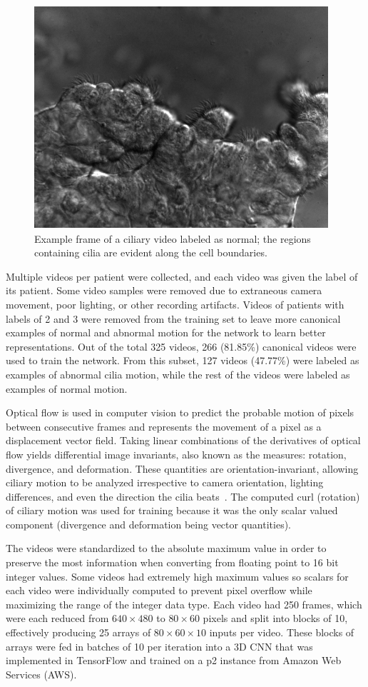\begin{figure}[htp]
\includegraphics[scale=0.78]{grey_1011-5_heathly}
\caption{Example frame of a ciliary video labeled as normal; the regions containing cilia are evident along the cell boundaries.}
\label{fig:cilia}
\end{figure}

Multiple videos per patient were collected, and each video was given the label of its patient. Some video samples were removed due to extraneous camera movement, poor lighting, or other recording artifacts. Videos of patients with labels of 2 and 3 were removed from the training set to leave more canonical examples of normal and abnormal motion for the network to learn better representations. Out of the total 325 videos, 266 (81.85\%) canonical videos were used to train the network. From this subset, 127 videos (47.77\%) were labeled as examples of abnormal cilia motion, while the rest of the videos were labeled as examples of normal motion.
 
Optical flow is used in computer vision to predict the probable motion of pixels between consecutive frames and represents the movement of a pixel as a displacement vector field. Taking linear combinations of the derivatives of optical flow yields differential image invariants, also known as the measures: rotation, divergence, and deformation. These quantities are orientation-invariant, allowing ciliary motion to be analyzed irrespective to camera orientation, lighting differences, and even the direction the cilia beats~\cite{quinn2015automated}. The computed curl (rotation) of ciliary motion was used for training because it was the only scalar valued component (divergence and deformation being vector quantities). 
 
The videos were standardized to the absolute maximum value in order to preserve the most information when converting from floating point to 16 bit integer values. Some videos had extremely high maximum values so scalars for each video were individually computed to prevent pixel overflow while maximizing the range of the integer data type. Each video had 250 frames, which were each reduced from $640 \times 480$ to $80 \times 60$ pixels and split into blocks of 10, effectively producing 25 arrays of $80 \times 60 \times 10$ inputs per video. These blocks of arrays were fed in batches of 10 per iteration into a 3D CNN that was implemented in TensorFlow and trained on a p2 instance from Amazon Web Services (AWS). 

